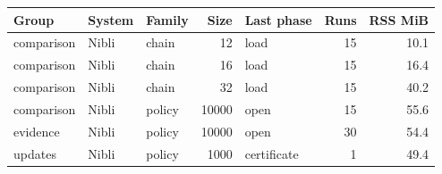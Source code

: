 \begin{tabular}{lllrlrr}
\toprule
Group & System & Family & Size & Last phase & Runs & RSS MiB \\
\midrule
comparison & Nibli & chain & 12 & load & 15 & 10.1 \\
comparison & Nibli & chain & 16 & load & 15 & 16.4 \\
comparison & Nibli & chain & 32 & load & 15 & 40.2 \\
comparison & Nibli & policy & 10000 & open & 15 & 55.6 \\
evidence & Nibli & policy & 10000 & open & 30 & 54.4 \\
updates & Nibli & policy & 1000 & certificate & 1 & 49.4 \\
\bottomrule
\end{tabular}
